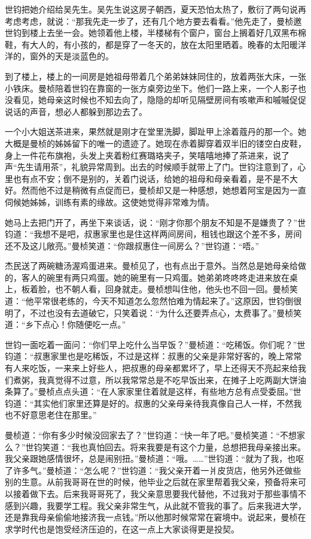 \par 世钧把她介绍给吴先生。吴先生说这房子朝西，夏天恐怕太热了，敷衍了两句说再考虑考虑，就说：“那我先走一步了，还有几个地方要去看看。”他先走了，曼桢邀世钧到楼上去坐一会。她领着他上楼，半楼梯有个窗户，窗台上搁着好几双黑布棉鞋，有大人的，有小孩的，都是穿了一冬天的，放在太阳里晒着。晚春的太阳暖洋洋的，窗外的天是淡蓝色的。
\par 到了楼上，楼上的一间房是她祖母带着几个弟弟妹妹同住的，放着两张大床，一张小铁床。曼桢陪着世钧在靠窗的一张方桌旁边坐下。他们一路上来，一个人影子也没看见，她母亲这时候也不知去向了，隐隐的却听见隔壁房间有咳嗽声和嘁嘁促促说话的声音，想必人都躲到那边去了。
\par 一个小大姐送茶进来，果然就是刚才在堂里洗脚，脚趾甲上涂着蔻丹的那一个。她大概是曼桢的姊姊留下的唯一的遗迹了。她现在赤着脚穿着双半旧的镂空白皮鞋，身上一件花布旗袍，头发上夹着粉红赛璐珞夹子，笑嘻嘻地捧了茶进来，说了声“先生请用茶”，礼貌异常周到。出去的时候顺手就带上了门。世钧注意到了，心里也有点不安；倒不是别的，关着门说话，给她的祖母和母亲看着，是不是不大好。然而他不过是稍微有点促而已，曼桢却又是一种感想，她想着阿宝是因为一直伺候她姊姊，训练有素的缘故。这使她觉得非常难为情。
\par 她马上去把门开了，再坐下来谈话，说：“刚才你那个朋友不知是不是嫌贵了？”世钧道：“我想不是吧，叔惠家里也是住这样两间房间，租钱也跟这个差不多，房间还不及这儿敞亮。”曼桢笑道：“你跟叔惠住一间房么？”世钧道：“唔。”
\par 杰民送了两碗糖汤渥鸡蛋进来。曼桢见了，也有点出于意外。当然总是她母亲给做的，客人的碗里有两只鸡蛋。她的碗里有一只鸡蛋。她弟弟咚咚咚走进来放在桌上，板着脸，也不朝人看，回身就走。曼桢想叫住他，他头也不回一回。曼桢笑道：“他平常很老练的，今天不知道怎么忽然怕难为情起来了。”这原因，世钧倒很明了，不过也没有去道破它，只笑着说：“为什么还要弄点心，太费事了。”曼桢笑道：“乡下点心！你随便吃一点。”
\par 世钧一面吃着一面问：“你们早上吃什么当早饭？”曼桢道：“吃稀饭。你们呢？”世钧道：“叔惠家里也是吃稀饭，不过是这样：叔惠的父亲是非常好客的，晚上常常有人来吃饭，一来来上好些人，把叔惠的母亲都累坏了，早上还得天不亮起来给我们煮粥，我真觉得不过意，所以我常常总是不吃早饭出来，在摊子上吃两副大饼油条算了。”曼桢点点头道：“在人家家里住着就是这样，有些地方总有点受委屈。”世钧道：“其实他们家里还算是好的。叔惠的父亲母亲待我真像自己人一样，不然我也不好意思老住在那里。”
\par 曼桢道：“你有多少时候没回家去了？”世钧道：“快一年了吧。”曼桢笑道：“不想家么？”世钧笑道：“我也真怕回去。将来我要是有这个力量，总想把我母亲接出来。我父亲跟她感情很坏，总是闹别扭。”曼桢道：“哦。……”世钧道：“就为了我，也呕了许多气。”曼桢道：“怎么呢？”世钧道：“我父亲开着一爿皮货店，他另外还做些别的生意。从前我哥哥在世的时候，他毕业之后就在家里帮着我父亲，预备将来可以接着做下去。后来我哥哥死了，我父亲意思要我代替他，不过我对于那些事情不感到兴趣，我要学工程。我父亲非常生气，从此就不管我的事了。后来我进大学，还是靠我母亲偷偷地接济我一点钱。”所以他那时候常常在窘境中。说起来，曼桢在求学时代也是饱受经济压迫的，在这一点上大家谈得更是投契。
